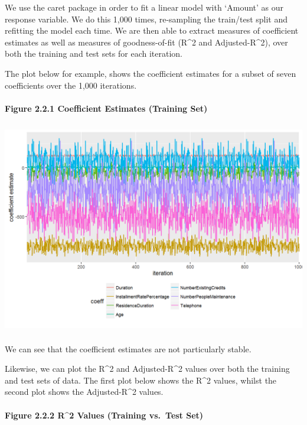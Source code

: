 \documentclass[]{article}
\let\oldparagraph\paragraph
\renewcommand{\paragraph}[1]{\oldparagraph{#1}\mbox{}}
\begin{document}
We use the caret package in order to fit a linear model with `Amount' as
our response variable. We do this 1,000 times, re-sampling the
train/test split and refitting the model each time. We are then able to
extract measures of coefficient estimates as well as measures of
goodness-of-fit (R\^{}2 and Adjusted-R\^{}2), over both the training and
test sets for each iteration.

The plot below for example, shows the coefficient estimates for a subset
of seven coefficients over the 1,000 iterations.

\newpage

\paragraph{Figure 2.2.1 Coefficient Estimates (Training
Set)}\label{figure-2.2.1-coefficient-estimates-training-set}

\includegraphics[height=3.64583in]{images/coeff.png}

We can see that the coefficient estimates are not particularly stable.

Likewise, we can plot the R\^{}2 and Adjusted-R\^{}2 values over both
the training and test sets of data. The first plot below shows the
R\^{}2 values, whilst the second plot shows the Adjusted-R\^{}2 values.

\paragraph{Figure 2.2.2 R\^{}2 Values (Training vs.~Test
Set)}\label{figure-2.2.2-r2-values-training-vs.test-set}
\end{document}
